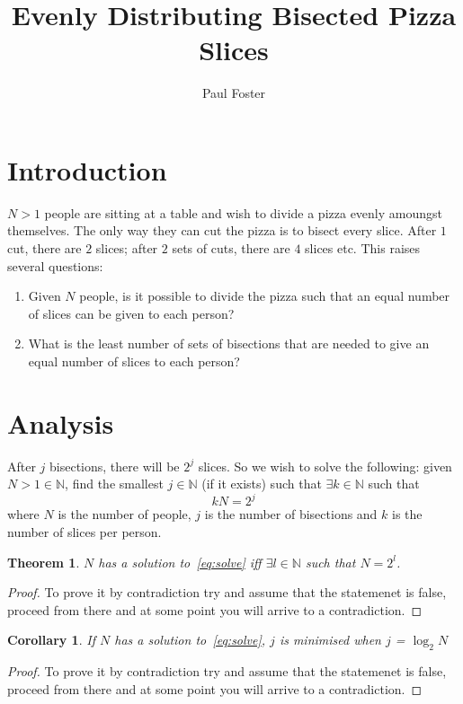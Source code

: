 \documentclass{article}
\title{Evenly Distributing Bisected Pizza Slices}
\author{Paul Foster}
\begin{document}
\maketitle

\newtheorem{theorem}{Theorem}
\newtheorem{corollary}{Corollary}[theorem]
\newtheorem{lemma}[theorem]{Lemma}

\section{Introduction}
$N>1$ people are sitting at a table and wish to divide a pizza evenly amoungst themselves. The only way they can cut the pizza is to bisect every slice. After $1$ cut, there are $2$ slices; after $2$ sets of cuts, there are $4$ slices etc. This raises several questions:
\begin{enumerate}
  \item Given $N$ people, is it possible to divide the pizza such that an equal number of slices can be given to each person?
  \item What is the least number of sets of bisections that are needed to give an equal number of slices to each person?
\end{enumerate}

\section{Analysis}
After $j$ bisections, there will be $2^j$ slices. So we wish to solve the following: given $N>1 \in \mathbb{N}$, find the smallest $j \in \mathbb{N}$ (if it exists) such that $\exists k \in \mathbb{N}$ such that
\begin{equation} \label{eq:solve}
  kN = 2^j
\end{equation}
where $N$ is the number of people, $j$ is the number of bisections and $k$ is the number of slices per person.

\begin{theorem}
$N$ has a solution to~\eqref{eq:solve} iff $\exists l \in \mathbb{N}$ such that $N = 2^l$.
\end{theorem}

\begin{proof}
To prove it by contradiction try and assume that the statemenet is false,
proceed from there and at some point you will arrive to a contradiction.
\end{proof}


\begin{corollary}
If $N$ has a solution to~\eqref{eq:solve}, $j$ is minimised when $j$ = $\log_2 N$
\end{corollary}

\begin{proof}
To prove it by contradiction try and assume that the statemenet is false,
proceed from there and at some point you will arrive to a contradiction.
\end{proof}
\end{document}
